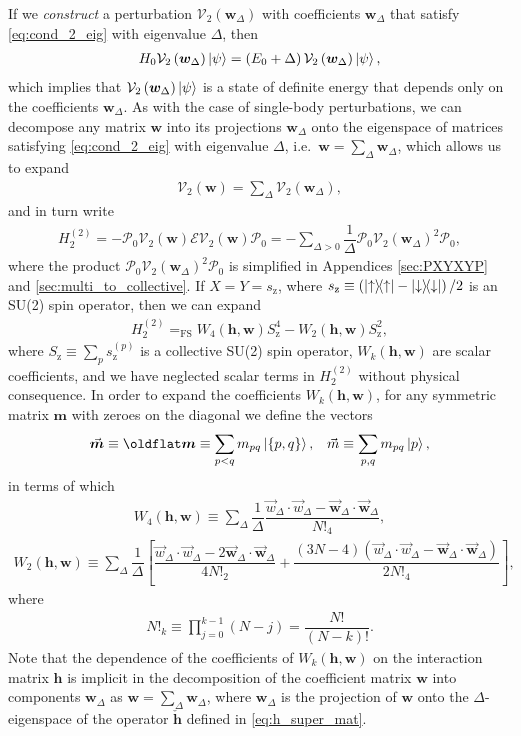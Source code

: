 \documentclass[nofootinbib,notitlepage,11pt]{revtex4-2}
\newcommand{\f}[2]{\dfrac{#1}{#2}} %
\newcommand{\p}[1]{\left(#1\right)} %
\renewcommand{\sp}[1]{\left[#1\right]} %
\renewcommand{\set}[1]{\left\{#1\right\}} %
\renewcommand{\c}{\cdot} %
\newcommand{\m}{\bm} %
\renewcommand{\v}{\vec} %
\newcommand{\1}{\mathds{1}}
\newcommand{\up}{\uparrow}
\newcommand{\dn}{\downarrow}
\newcommand{\z}{\text{z}}
\newcommand{\E}{\mathcal{E}}
\renewcommand{\P}{\mathcal{P}}
\newcommand{\V}{\mathcal{V}}
\newcommand{\EQFS}{=_{\text{FS}}}
\let\flat\oldflat
\DeclareMathOperator{\flat}{flat}
\begin{document}
If we {\it construct} a perturbation $\V_2\p{\m w_\Delta}$ with
coefficients $\m w_\Delta$ that satisfy \eqref{eq:cond_2_eig} with
eigenvalue $\Delta$, then
\begin{align}
  H_0 \V_2\p{\m w_\Delta} \ket\psi
  = \p{E_0 + \Delta} \V_2\p{\m w_\Delta} \ket\psi,
\end{align}
which implies that $\V_2\p{\m w_\Delta}\ket\psi$ is a state of
definite energy that depends only on the coefficients $\m w_\Delta$.
As with the case of single-body perturbations, we can decompose any
matrix $\m w$ into its projections $\m w_\Delta$ onto the eigenspace
of matrices satisfying \eqref{eq:cond_2_eig} with eigenvalue $\Delta$,
i.e.~$\m w=\sum_\Delta\m w_\Delta$, which allows us to expand
\begin{align}
  \V_2\p{\m w} = \sum_\Delta \V_2\p{\m w_\Delta},
\end{align}
and in turn write
\begin{align}
  H_2^{(2)} = - \P_0 \V_2\p{\m w} \E \V_2\p{\m w} \P_0
  = -\sum_{\Delta>0} \f1\Delta \P_0 \V_2\p{\m w_\Delta}^2 \P_0,
\end{align}
where the product $\P_0 \V_2\p{\m w_\Delta}^2 \P_0$ is simplified in
Appendices \ref{sec:PXYXYP} and \ref{sec:multi_to_collective}.  If
$X=Y=s_\z$, where $s_\z\equiv\p{\op\up-\op\dn}/2$ is an SU(2) spin
operator, then we can expand
\begin{align}
  H_2^{(2)} \EQFS W_4\p{\m h,\m w} S_\z^4 - W_2\p{\m h,\m w} S_\z^2,
\end{align}
where $S_\z\equiv\sum_p s_\z^{(p)}$ is a collective SU(2) spin
operator, $W_k\p{\m h,\m w}$ are scalar coefficients, and we have
neglected scalar terms in $H_2^{(2)}$ without physical consequence.
In order to expand the coefficients $W_k\p{\m h,\m w}$, for any
symmetric matrix $\m m$ with zeroes on the diagonal we define the
vectors
\begin{align}
  \v{\m m} \equiv \flat\m m \equiv \sum_{p<q} m_{pq} \ket{\set{p,q}},
  &&
  \v m \equiv \sum_{p,q} m_{pq} \ket{p},
\end{align}
in terms of which
\begin{align}
  W_4\p{\m h,\m w}
  \equiv \sum_\Delta \f1\Delta \f{\v w_\Delta\c\v w_\Delta
    - \v{\m w}_\Delta\c\v{\m w}_\Delta}{N!_4},
\end{align}
\begin{align}
  W_2\p{\m h,\m w}
  \equiv \sum_\Delta \f1{\Delta} \sp{\f{\v w_\Delta\c\v w_\Delta
      - 2\v{\m w}_\Delta\c\v{\m w}_\Delta}{4N!_2}
    + \f{\p{3N-4}\p{\v w_\Delta\c\v w_\Delta
        - \v{\m w}_\Delta\c\v{\m w}_\Delta}}{2N!_4}},
\end{align}
where
\begin{align}
  N!_k \equiv \prod_{j=0}^{k-1} \p{N-j} = \f{N!}{\p{N-k}!}.
\end{align}
Note that the dependence of the coefficients of $W_k\p{\m h,\m w}$ on
the interaction matrix $\m h$ is implicit in the decomposition of the
coefficient matrix $\m w$ into components $\m w_\Delta$ as
$\m w=\sum_\Delta\m w_\Delta$, where $\m w_\Delta$ is the projection
of $\m w$ onto the $\Delta$-eigenspace of the operator $\check{\m h}$
defined in \eqref{eq:h_super_mat}.
\end{document}
